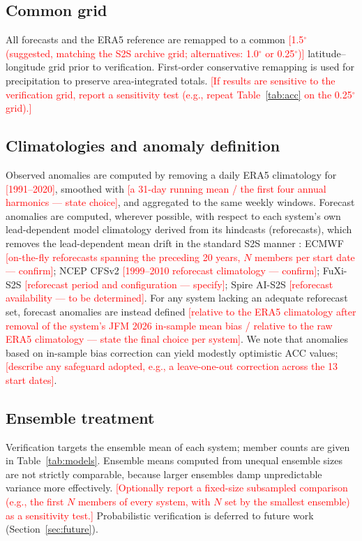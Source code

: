 \documentclass[11pt]{article}
\newcommand{\ph}[1]{\textcolor{red}{[#1]}}
\begin{document}
\subsection{Common grid}\label{sec:grid}

All forecasts and the ERA5 reference are remapped to a common
\ph{1.5$^{\circ}$ (suggested, matching the S2S archive grid;
alternatives: 1.0$^{\circ}$ or 0.25$^{\circ}$)} latitude--longitude
grid prior to verification. First-order conservative remapping is used
for precipitation to preserve area-integrated totals. \ph{If results
are sensitive to the verification grid, report a sensitivity test
(e.g., repeat Table~\ref{tab:acc} on the 0.25$^{\circ}$ grid).}

\subsection{Climatologies and anomaly definition}\label{sec:anom}

Observed anomalies are computed by removing a daily ERA5 climatology
for \ph{1991--2020}, smoothed with \ph{a 31-day running mean / the
first four annual harmonics --- state choice}, and aggregated to the
same weekly windows. Forecast anomalies are computed, wherever
possible, with respect to each system's own lead-dependent model
climatology derived from its hindcasts (reforecasts), which removes the
lead-dependent mean drift in the standard S2S manner
\citep{vitart2017}: ECMWF \ph{on-the-fly reforecasts spanning the
preceding 20 years, $N$ members per start date --- confirm}; NCEP
CFSv2 \ph{1999--2010 reforecast climatology --- confirm}; FuXi-S2S
\ph{reforecast period and configuration --- specify}; Spire AI-S2S
\ph{reforecast availability --- to be determined}. For any system
lacking an adequate reforecast set, forecast anomalies are instead
defined \ph{relative to the ERA5 climatology after removal of the
system's JFM 2026 in-sample mean bias / relative to the raw ERA5
climatology --- state the final choice per system}. We note that
anomalies based on in-sample bias correction can yield modestly
optimistic ACC values; \ph{describe any safeguard adopted, e.g., a
leave-one-out correction across the 13 start dates}.

\subsection{Ensemble treatment}\label{sec:ens}

Verification targets the ensemble mean of each system; member counts
are given in Table~\ref{tab:models}. Ensemble means computed from
unequal ensemble sizes are not strictly comparable, because larger
ensembles damp unpredictable variance more effectively.
\ph{Optionally report a fixed-size subsampled comparison (e.g., the
first $N$ members of every system, with $N$ set by the smallest
ensemble) as a sensitivity test.} Probabilistic verification is
deferred to future work (Section~\ref{sec:future}).
\end{document}
